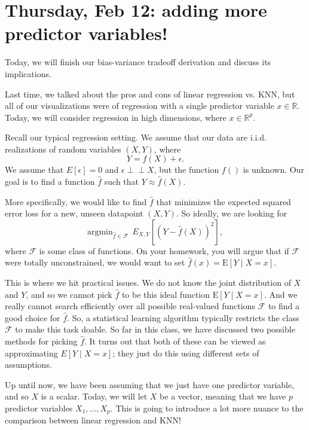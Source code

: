 \section{Thursday, Feb 12: adding more predictor variables!}

Today, we will finish our bias-variance tradeoff derivation and discuss its implications.

Last time, we talked about the pros and cons of linear regression vs. KNN, but all of our visualizations were of regression with a single predictor variable $x \in \mathbb{R}$. Today, we will consider regression in high dimensions, where  $x \in \mathbb{R}^p$.

Recall our typical regression setting. We assume that our data are i.i.d. realizations of random variables $(X,Y)$, where
$$
Y = f(X) + \epsilon.
$$
We assume that $E[\epsilon]=0$ and $\epsilon \perp\!\!\!\perp X$, but the function $f()$ is unknown. Our goal is to find a function $\hat{f}$ such that $Y \approx \hat{f}(X)$. 

More specifically, we would like to find $\hat{f}$ that minimizes the expected squared error loss for a new, unseen datapoint $(X,Y)$. So ideally, we are looking for
\begin{equation}
\label{objective}
\mathrm{argmin}_{\hat{f} \in \mathcal{F}} \ \ E_{X,Y} \left[ \left(Y - \hat{f}(X)\right)^2 \right],
\end{equation}
where $\mathcal{F}$ is some class of functions. On your homework, you will argue that if $\mathcal{F}$ were totally unconstrained, we would want to set $\hat{f}(x) = \mathrm{E}[Y \mid X=x]$. 

This is where we hit practical issues. We do not know the joint distribution of $X$ and $Y$, and so we cannot pick $\hat{f}$ to be this ideal function $\mathrm{E}[Y \mid X=x]$. And we really cannot search efficiently over all possible real-valued functions $\mathcal{F}$ to find a good choice for $\hat{f}$. So, a statistical learning algorithm typically restricts the class $\mathcal{F}$ to make this task doable. So far in this class, we have discussed two possible methods for picking $\hat{f}$. It turns out that both of these can be viewed as approximating $E[Y \mid X=x]$; they just do this using different sets of assumptions. 

Up until now, we have been assuming that we just have one predictor variable, and so $X$ is a scalar. Today, we will let $X$ be a vector, meaning that we have $p$ predictor variables $X_1, \ldots, X_p$. This is going to introduce a lot more nuance to the comparison between linear regression and KNN!

